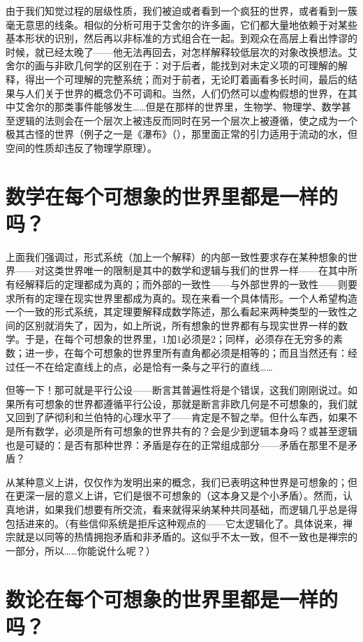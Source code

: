 由于我们知觉过程的层级性质，我们被迫或者看到一个疯狂的世界，或者看到一簇毫无意思的线条。相似的分析可用于艾舍尔的许多画，它们都大量地依赖于对某些基本形状的识别，然后再以非标准的方式组合在一起。到观众在高层上看出悖谬的时候，就已经太晚了——他无法再回去，对怎样解释较低层次的对象改换想法。艾舍尔的画与非欧几何学的区别在于：对于后者，能找到对未定义项的可理解的解释，得出一个可理解的完整系统；而对于前者，无论盯着画看多长时间，最后的结果与人们关于世界的概念仍不可调和。当然，人们仍然可以虚构假想的世界，在其中艾舍尔的那类事件能够发生……但是在那样的世界里，生物学、物理学、数学甚至逻辑的法则会在一个层次上被违反而同时在另一个层次上被遵循，使之成为一个极其古怪的世界（例子之一是《瀑布》（），那里面正常的引力适用于流动的水，但空间的性质却违反了物理学原理）。

\section{数学在每个可想象的世界里都是一样的吗？}

上面我们强调过，形式系统（加上一个解释）的内部一致性要求存在某种想象的世界——对这类世界唯一的限制是其中的数学和逻辑与我们的世界一样——在其中所有经解释后的定理都成为真的；而外部的一致性——与外部世界的一致性——则要求所有的定理在现实世界里都成为真的。现在来看一个具体情形。一个人希望构造一个一致的形式系统，其定理要解释成数学陈述，那么看起来两种类型的一致性之间的区别就消失了，因为，如上所说，所有想象的世界都有与现实世界一样的数学。于是，在每个可想象的世界里，$1$加$1$必须是$2$；同样，必须存在无穷多的素数；进一步，在每个可想象的世界里所有直角都必须是相等的；而且当然还有：经过任一不在给定直线上的点，必是恰有一条与之平行的直线……

但等一下！那可就是平行公设——断言其普遍性将是个错误，这我们刚刚说过。如果所有可想象的世界都遵循平行公设，那就是断言非欧几何是不可想象的，我们就又回到了萨彻利和兰伯特的心理水平了——肯定是不智之举。但什么车西，如果不是所有数学，必须是所有可想象的世界共有的？会是少到逻辑本身吗？或甚至逻辑也是可疑的：是否有那种世界：矛盾是存在的正常组成部分——矛盾在那里不是矛盾？

从某种意义上讲，仅仅作为发明出来的概念，我们已表明这种世界是可想象的；但在更深一层的意义上讲，它们是很不可想象的（这本身又是个小矛盾）。然而，认真地讲，如果我们想要有所交流，看来就得采纳某种共同基础，而逻辑几乎总是得包括进来的。（有些信仰系统是拒斥这种观点的——它太逻辑化了。具体说来，禅宗就是以同等的热情拥抱矛盾和非矛盾的。这似乎不太一致，但不一致也是禅宗的一部分，所以……你能说什么呢？）

\section{数论在每个可想象的世界里都是一样的吗？}

